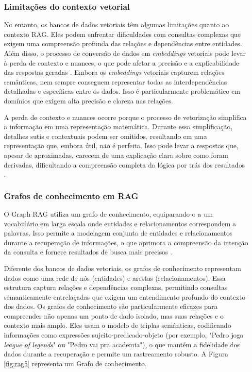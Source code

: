 \subsubsection{Limitações do contexto vetorial}
No entanto, os bancos de dados vetoriais têm algumas limitações quanto ao contexto RAG. Eles podem enfrentar dificuldades com consultas complexas que exigem uma compreensão profunda das relações e dependências entre entidades. Além disso, o processo de conversão de dados em \textit{embeddings} vetoriais pode levar à perda de contexto e nuances, o que pode afetar a precisão e a explicabilidade das respostas geradas \cite{kang2024promptragpioneeringvectorembeddingfree}. Embora os \textit{embeddings} vetoriais capturem relações semânticas, nem sempre conseguem representar todas as interdependências detalhadas e específicas entre os dados. Isso é particularmente problemático em domínios que exigem alta precisão e clareza nas relações.

A perda de contexto e nuances ocorre porque o processo de vetorização simplifica a informação em uma representação matemática. Durante essa simplificação, detalhes sutis e contextuais podem ser omitidos, resultando em uma representação que, embora útil, não é perfeita. Isso pode levar a respostas que, apesar de aproximadas, carecem de uma explicação clara sobre como foram derivadas, dificultando a compreensão completa da lógica por trás dos resultados \cite{cheng2024characterizing}.

\subsubsection{Grafos de conhecimento em RAG}
O Graph RAG utiliza um grafo de conhecimento, equiparando-o a um vocabulário em larga escala onde entidades e relacionamentos correspondem a palavras. Isso permite a modelagem conjunta de entidades e relacionamentos durante a recuperação de informações, o que aprimora a compreensão da intenção da consulta e fornece resultados de busca mais precisos \cite{edge2024local}.

Diferente dos bancos de dados vetoriais, os grafos de conhecimento representam dados como uma rede de nós (entidades) e arestas (relacionamentos). Essa estrutura captura relações e dependências complexas, permitindo consultas semanticamente entrelaçadas que exigem um entendimento profundo do contexto dos dados. Os grafos de conhecimento são particularmente eficazes para compreender não apenas um ponto de dado isolado, mas suas relações e o contexto mais amplo. Eles usam o modelo de triplas semânticas, codificando informações como expressões sujeito-predicado-objeto (por exemplo, "Pedro joga \textit{league of legends}" ou "Pedro vai pra academia"), o que mantém a fidelidade dos dados durante a recuperação e permite um rastreamento robusto. A Figura \ref{fig:rag5} representa um Grafo de conhecimento.

